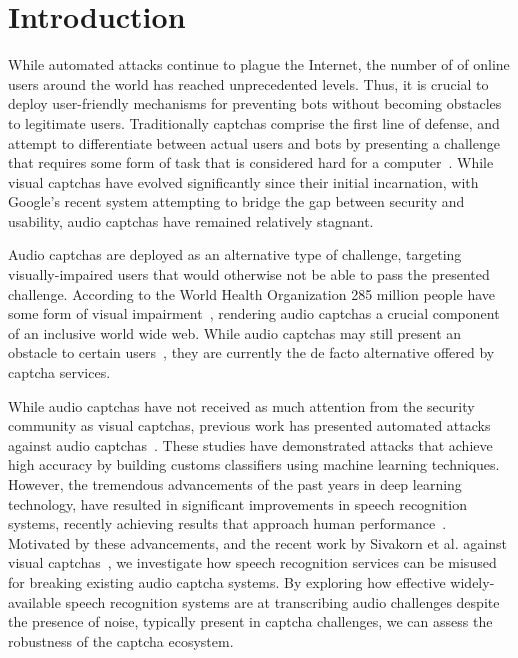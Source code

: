 \section{Introduction}
\label{sec:intro}

While automated attacks continue to plague the Internet,
the number of of online users around the world has reached unprecedented levels.
Thus, it is crucial to deploy user-friendly mechanisms for preventing bots without
becoming obstacles to legitimate users. Traditionally captchas comprise the first 
line of defense, and attempt to differentiate between actual users and bots by 
presenting a challenge that requires some form of task that is considered hard 
for a computer~\cite{captcha}. While visual captchas have evolved significantly since 
their initial incarnation, with Google's recent \re system attempting to bridge 
the gap between security and usability, audio captchas have remained relatively
stagnant.

Audio captchas are deployed as an alternative type of challenge, targeting
visually-impaired users that would otherwise not be able to pass the presented
challenge. According to the World Health Organization 285 million people have 
some form of visual impairment~\cite{impaired}, rendering audio captchas a
crucial component of an inclusive world wide web. While audio captchas may still present
an obstacle to certain users~\cite{sauer2008towards,bigham2008inspiring,bigham2009evaluating},
they are currently the de facto alternative offered by captcha services.

While audio captchas have not received as much attention from the security community as visual captchas,
previous work has presented automated attacks against audio captchas~\cite{Sano2013,Bursztein2009,
meutzner2014using,tam2009breaking,bursztein2011failure}. These studies have demonstrated attacks
that achieve high accuracy by building customs classifiers using machine learning techniques.
However, the tremendous advancements of the past years in deep learning technology, have
resulted in significant improvements in speech recognition systems, recently achieving
results that approach human performance~\cite{ibm_blog,saon2017english}. Motivated
by these advancements, and the recent work by Sivakorn et al. against visual
captchas~\cite{sivakorn:eurosp16}, we investigate how speech recognition services
can be misused for breaking existing audio captcha systems. By exploring how effective
widely-available speech recognition systems are at transcribing audio challenges despite 
the presence of noise, typically present in captcha challenges, we can assess the robustness 
of the captcha ecosystem.

